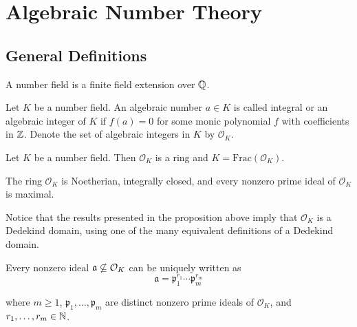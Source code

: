 \setchapterpreamble[u]{\margintoc}
\chapter{Algebraic Number Theory}

\section{General Definitions}

\begin{definition}
    A number field is a finite field extension over $\mathbb{Q}$.
\end{definition}

\begin{definition}
    Let $K$ be a number field. An algebraic number $a \in K$ is called integral or an algebraic integer of $K$ if $f(a) = 0$ for some monic polynomial $f$ with coefficients in $\mathbb{Z}$. Denote the set of algebraic integers in $K$ by $\mathcal{O}_{K}$.
\end{definition}


\begin{proposition}
    Let $K$ be a number field. Then $\mathcal{O}_{K}$ is a ring and $K = \textrm{Frac}(\mathcal{O}_{K})$.
\end{proposition}

\begin{proposition}
    The ring $\mathcal{O}_{K}$ is Noetherian, integrally closed, and every nonzero prime ideal of $\mathcal{O}_{K}$ is maximal.
\end{proposition}

Notice that the results presented in the proposition above imply that $\mathcal{O}_{K}$ is a Dedekind domain, using one of the many equivalent definitions of a Dedekind domain.

\begin{theorem}
    Every nonzero ideal $\mathfrak{a} \not\subseteq \mathcal{O}_{K}$ can be uniquely written as
        \[\mathfrak{a} = \mathfrak{p}_1^{r_1}\cdots \mathfrak{p}_m^{r_m}\]

    where $m \geq 1$, $\mathfrak{p}_1,\ldots, \mathfrak{p}_m$ are distinct nonzero prime ideals of $\mathcal{O}_{K}$, and $r_1, \ldots, r_m \in \mathbb{N}$.
\end{theorem}


